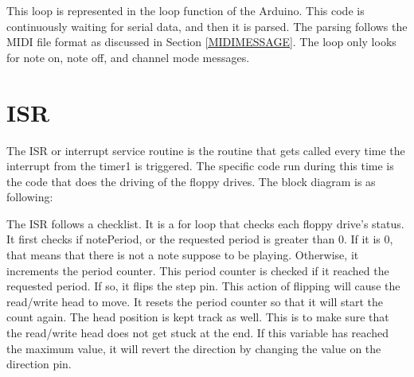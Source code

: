 \documentclass[11pt, a4paper]{report}
\begin{document}
This loop is represented in the loop function of the Arduino. This code is continuously waiting for serial data, and then it is parsed. The parsing follows the MIDI file format as discussed in Section \ref{MIDIMESSAGE}. The loop only looks for note on, note off, and channel mode messages.  



\section{ISR}

The ISR or interrupt service routine is the routine that gets called every time the interrupt from the timer1 is triggered. The specific code run during this time is the code that does the driving of the floppy drives. The block diagram is as following:


\pagebreak
The ISR follows a checklist. It is a for loop that checks each floppy drive's status. It first checks if notePeriod, or the requested period is greater than 0. If it is 0, that means that there is not a note suppose to be playing. Otherwise, it increments the period counter. This period counter is checked if it reached the requested period. If so, it flips the step pin. This action of flipping will cause the read/write head to move. It resets the period counter so that it will start the count again. The head position is kept track as well. This is to make sure that the read/write head does not get stuck at the end. If this variable has reached the maximum value, it will revert the direction by changing the value on the direction pin.
\end{document}
